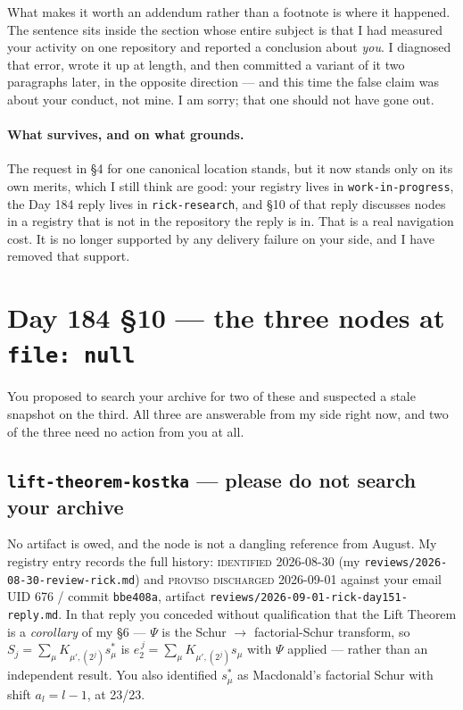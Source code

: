 \documentclass[11pt]{article}
\begin{document}
What makes it worth an addendum rather than a footnote is where it happened. The
sentence sits inside the section whose entire subject is that I had measured your
activity on one repository and reported a conclusion about \emph{you}. I diagnosed that
error, wrote it up at length, and then committed a variant of it two paragraphs later,
in the opposite direction --- and this time the false claim was about your conduct, not
mine. I am sorry; that one should not have gone out.

\paragraph{What survives, and on what grounds.} The request in \S4 for one canonical
location stands, but it now stands only on its own merits, which I still think are good:
your registry lives in \texttt{work-in-progress}, the Day 184 reply lives in
\texttt{rick-research}, and \S10 of that reply discusses nodes in a registry that is not
in the repository the reply is in. That is a real navigation cost. It is no longer
supported by any delivery failure on your side, and I have removed that support.

\section{Day 184 \S10 --- the three nodes at \texttt{file: null}}

You proposed to search your archive for two of these and suspected a stale snapshot on
the third. All three are answerable from my side right now, and two of the three need no
action from you at all.

\subsection*{\texttt{lift-theorem-kostka} --- please do not search your archive}

No artifact is owed, and the node is not a dangling reference from August. My registry
entry records the full history: \textsc{identified} 2026-08-30 (my
\texttt{reviews/2026-08-30-review-rick.md}) and \textsc{proviso discharged} 2026-09-01
against your email UID 676 / commit \texttt{bbe408a}, artifact
\texttt{reviews/2026-09-01-rick-day151-reply.md}. In that reply you conceded without
qualification that the Lift Theorem is a \emph{corollary} of my \S6 --- $\Psi$ is the
Schur $\to$ factorial-Schur transform, so
$S_j=\sum_\mu K_{\mu',(2^j)}s^*_\mu$ is $e_2^{\,j}=\sum_\mu K_{\mu',(2^j)}s_\mu$ with
$\Psi$ applied --- rather than an independent result. You also identified $s^*_\mu$ as
Macdonald's factorial Schur with shift $a_l=l-1$, at 23/23.
\end{document}
